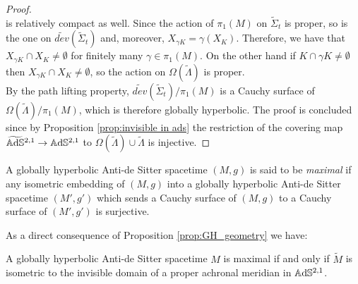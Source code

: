 \begin{proof}
\[    \]
    is relatively compact as well. Since the action of $\pi_1(M)$ on $\widetilde{\Sigma}_t$ is proper, so is the one on $\widetilde{dev}(\widetilde{\Sigma}_t)$ and, moreover, $X_{\gamma K} = \gamma(X_K)$. Therefore, we have that $X_{\gamma K} \cap X_K \neq \emptyset$ for finitely many $\gamma \in \pi_1(M)$. On the other hand if $K \cap \gamma K \neq \emptyset$ then $X_{\gamma K} \cap X_K \neq \emptyset$, so the action on $\Omega(\widetilde{\Lambda})$ is proper.\\
    By the path lifting property, $\widetilde{dev}(\widetilde{\Sigma}_t) / \pi_1(M)$ is a Cauchy surface of $\Omega(\widetilde{\Lambda}) / \pi_1(M)$, which is therefore globally hyperbolic. The proof is concluded since by Proposition \ref{prop:invisible in ads} the restriction of the covering map $\widetilde{\mathbb{A}\mathrm{d}\mathbb{S}}{}^{2,1} \to \mathbb{A}\mathrm{d}\mathbb{S}^{2,1}$ to $\Omega(\widetilde{\Lambda}) \cup \widetilde{\Lambda}$ is injective.
\end{proof}
\begin{definition}
    A globally hyperbolic Anti-de Sitter spacetime $(M,g)$ is said to be \textit{maximal} if any isometric embedding of $(M,g)$ into a globally hyperbolic Anti-de Sitter spacetime $(M',g')$ which sends a Cauchy surface of $(M,g)$ to a Cauchy surface of $(M',g')$ is surjective.
\end{definition}
As a direct consequence of Proposition \ref{prop:GH_geometry} we have:
\begin{corollary} \label{cor:MGH}
    A globally hyperbolic Anti-de Sitter spacetime $M$ is maximal if and only if $\widetilde{M}$ is isometric to the invisible domain of a proper achronal meridian in $\mathbb{A}\mathrm{d}\mathbb{S}^{2,1}$.
\end{corollary}

